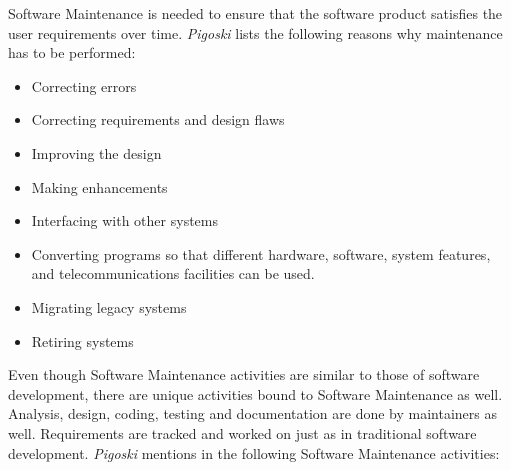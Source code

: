 Software Maintenance is needed to ensure that the software product satisfies the user requirements over time. \textit{Pigoski} lists the following reasons why maintenance has to be performed:\citep{pigoski_software_2015}

\begin{itemize}
    \item Correcting errors
    \item Correcting requirements and design flaws
    \item Improving the design
    \item Making enhancements
    \item Interfacing with other systems
    \item Converting programs so that different hardware, software, system features, and telecommunications facilities can be used.
    \item Migrating legacy systems
    \item Retiring systems
\end{itemize}

Even though Software Maintenance activities are similar to those of software development, there are unique activities bound to Software Maintenance as well. Analysis, design, coding, testing and documentation are done by maintainers as well. Requirements are tracked and worked on just as in traditional software development. \textit{Pigoski} mentions in \citep{pigoski_software_2015} the following Software Maintenance activities: \citep{pigoski_software_2015} 

